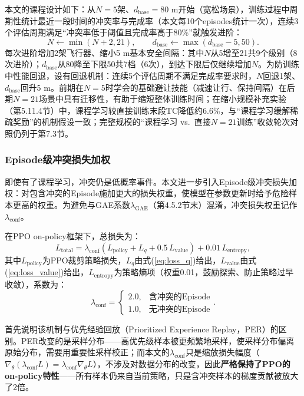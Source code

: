 \documentclass[12pt,a4paper,UTF8]{ctexart}
\begin{document}
本文的课程设计如下：从$N=5$架、$d_{\text{base}}=80$ m开始（宽松场景），训练过程中周期性统计最近一段时间的冲突率与完成率（本文每10个episodes统计一次），连续3个评估周期满足“冲突率低于阈值且完成率高于80\%”就触发进阶：
\begin{equation}
    N \leftarrow \min(N+2, 21), \qquad d_{\text{base}} \leftarrow \max(d_{\text{base}}-5, 50).
    \label{eq:curriculum}
\end{equation}
每次进阶增加2架飞行器、缩小5 m基本安全间隔：其中$N$从5增至21共9个级别（8次进阶）；$d_{\text{base}}$从80降至下限50共7档（6次），到达下限后仅继续增加$N$。为防训练中性能回退，设有回退机制：连续5个评估周期不满足完成率要求时，$N$回退1架、$d_{\text{base}}$回升5 m。前期在$N=5$时学会的基础避让技能（减速让行、保持间隔）在后期$N=21$场景中具有迁移性，有助于缩短整体训练时间；在缩小规模补充实验（第5.11.4节）中，课程学习较直接训练末段TC降低约6.6\%，与“课程学习缓解稀疏奖励”的机制假设一致；完整规模的“课程学习 vs.\ 直接$N=21$训练”收敛轮次对照仍列于第7.3节。

\subsubsection{Episode级冲突损失加权}

即使有了课程学习，冲突仍是低概率事件。本文进一步引入Episode级冲突损失加权：对包含冲突的Episode施加更大的损失权重，使模型在参数更新时给予危险样本更高的权重。为避免与GAE系数$\lambda_{\text{GAE}}$（第4.5.2节末）混淆，冲突损失权重记作$\lambda_{\text{conf}}$。

在PPO\cite{ref30} on-policy框架下，总损失为：
\begin{equation}
    L_{\text{total}} = \lambda_{\text{conf}}\left(L_{\text{policy}} + L_{q} + 0.5\,L_{\text{value}}\right) + 0.01\,L_{\text{entropy}},
    \label{eq:total_loss}
\end{equation}
其中$L_{\text{policy}}$为PPO裁剪策略损失，$L_{q}$由式(\ref{eq:loss_q})给出，$L_{\text{value}}$由式(\ref{eq:loss_value})给出，$L_{\text{entropy}}$为策略熵项（权重0.01，鼓励探索、防止策略过早收敛），系数为：
\begin{equation}
    \lambda_{\text{conf}} = \begin{cases}
        2.0, & \text{含冲突的Episode}\\
        1.0, & \text{无冲突的Episode}
    \end{cases}.
    \label{eq:lambda}
\end{equation}

首先说明该机制与优先经验回放（Prioritized Experience Replay，PER）的区别。PER改变的是采样分布——高优先级样本被更频繁地采样，使采样分布偏离原始分布，需要用重要性采样校正；而本文的$\lambda_{\text{conf}}$只是缩放损失幅度（$\nabla_\theta(\lambda_{\text{conf}} L)=\lambda_{\text{conf}}\nabla_\theta L$），不涉及对数据分布的改变，因此\textbf{严格保持了PPO的on-policy特性}——所有样本仍来自当前策略，只是含冲突样本的梯度贡献被放大了2倍。
\end{document}
